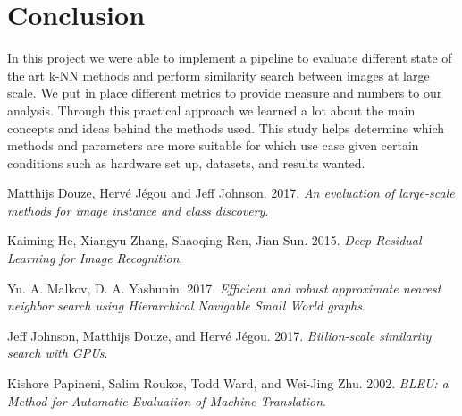\documentclass[a4paper]{article}
\begin{document}
\section*{Conclusion}

In this project we were able to implement a pipeline to evaluate different state of the art k-NN methods and perform similarity search between images at large scale. We put in place different metrics to provide measure and numbers to our analysis. Through this practical approach we learned a lot about the main concepts and ideas behind the methods used. This study helps determine which methods and parameters are more suitable for which use case given certain conditions such as hardware set up, datasets, and results wanted. 

\begin{thebibliography}{5}

Matthijs Douze, Hervé Jégou and Jeff Johnson. 2017.
\textit{An evaluation of large-scale methods for image instance and class discovery}.

Kaiming He, Xiangyu Zhang, Shaoqing Ren, Jian Sun. 2015.
\textit{Deep Residual Learning for Image Recognition}.

Yu. A. Malkov, D. A. Yashunin. 2017.
\textit{Efficient and robust approximate nearest neighbor search using Hierarchical Navigable Small World graphs}.

Jeff Johnson, Matthijs Douze, and Hervé Jégou. 2017.
\textit{Billion-scale similarity search with GPUs}. 

Kishore Papineni, Salim Roukos, Todd Ward, and Wei-Jing Zhu. 2002.
\textit{BLEU: a Method for Automatic Evaluation of Machine Translation}. 


\end{thebibliography}
\end{document}
